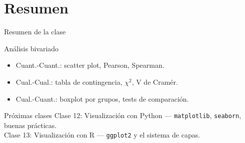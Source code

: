 \documentclass[aspectratio=169]{beamer}
\begin{document}
\section{Resumen}

\begin{frame}{Resumen de la clase}
  \begin{block}{Análisis bivariado}
    \begin{itemize}
      \item Cuant.-Cuant.: scatter plot, Pearson, Spearman.
      \item Cual.-Cual.: tabla de contingencia, $\chi^2$, V de Cramér.
      \item Cual.-Cuant.: boxplot por grupos, tests de comparación.
    \end{itemize}
  \end{block}
  \bigskip
  \begin{block}{Próximas clases}
    Clase 12: Visualización con Python — \texttt{matplotlib}, \texttt{seaborn}, buenas prácticas. \\
    Clase 13: Visualización con R — \texttt{ggplot2} y el sistema de capas.
  \end{block}
\end{frame}
\end{document}
